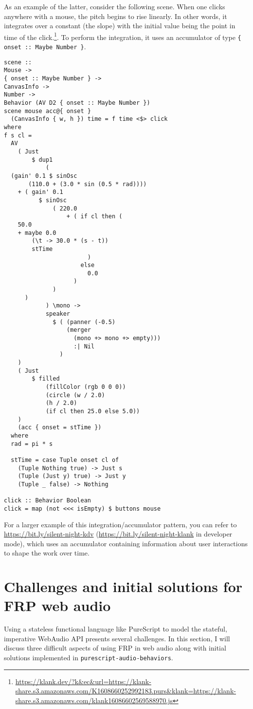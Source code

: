 \documentclass{sig-alternate}
\begin{document}
\begin{sloppypar}
  As an example of the latter, consider the following scene.  When one clicks anywhere with a mouse, the pitch begins to rise linearly. In other words, it integrates over a constant (the slope) with the initial value being the point in time of the click.\footnote{\url{https://klank.dev/?k&ec&url=https://klank-share.s3.amazonaws.com/K1608660252992183.purs&klank=https://klank-share.s3.amazonaws.com/klank16086602569588970.js}}.  To perform the integration, it uses an accumulator of type \verb={ onset :: Maybe Number }=.

  \begin{verbatim}
scene ::
Mouse ->
{ onset :: Maybe Number } ->
CanvasInfo ->
Number ->
Behavior (AV D2 { onset :: Maybe Number })
scene mouse acc@{ onset }
  (CanvasInfo { w, h }) time = f time <$> click
where
f s cl =
  AV
    ( Just
        $ dup1
            ( 
  (gain' 0.1 $ sinOsc 
       (110.0 + (3.0 * sin (0.5 * rad))))
    + ( gain' 0.1
          $ sinOsc
              ( 220.0
                  + ( if cl then (
    50.0
    + maybe 0.0
        (\t -> 30.0 * (s - t))
        stTime
                        )
                      else
                        0.0
                    )
              )
      )
            ) \mono ->
            speaker
              $ ( (panner (-0.5) 
                  (merger
                    (mono +> mono +> empty)))
                    :| Nil
                )
    )
    ( Just
        $ filled
            (fillColor (rgb 0 0 0))
            (circle (w / 2.0)
            (h / 2.0)
            (if cl then 25.0 else 5.0))
    )
    (acc { onset = stTime })
  where
  rad = pi * s

  stTime = case Tuple onset cl of
    (Tuple Nothing true) -> Just s
    (Tuple (Just y) true) -> Just y
    (Tuple _ false) -> Nothing

click :: Behavior Boolean
click = map (not <<< isEmpty) $ buttons mouse
\end{verbatim}

  For a larger example of this integration/accumulator pattern, you can refer to \url{https://bit.ly/silent-night-kdv} (\url{https://bit.ly/silent-night-klank} in developer mode), which uses an accumulator containing information about user interactions to shape the work over time.

  \section{Challenges and initial solutions for FRP web audio}
  Using a stateless functional language like PureScript to model the stateful, imperative WebAudio API presents several challenges.  In this section, I will discuss three difficult aspects of using FRP in web audio along with initial solutions implemented in \texttt{purescript-audio-behaviors}.


\end{sloppypar}
\end{document}

